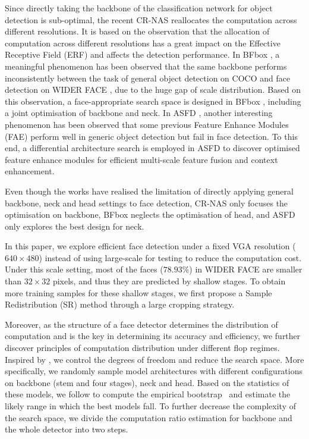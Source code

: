 \documentclass[10pt,twocolumn,letterpaper]{article}
\begin{document}
Since directly taking the backbone of the classification network for object detection is sub-optimal, the recent CR-NAS \cite{liang2019computation} reallocates the computation across different resolutions. It is based on the observation that the allocation of computation across different resolutions has a great impact on the Effective Receptive Field (ERF) and affects the detection performance. In BFbox \cite{liu2020bfbox}, a meaningful phenomenon has been observed that the same backbone performs inconsistently between the task of general object detection on COCO \cite{lin2014microsoft} and face detection on WIDER FACE \cite{yang2016wider}, due to the huge gap of scale distribution. Based on this observation, a face-appropriate search space is designed in BFbox \cite{liu2020bfbox}, including a joint optimisation of backbone and neck. In ASFD \cite{zhang2020asfd}, another interesting phenomenon has been observed that some previous Feature Enhance Modules (FAE) perform well in generic object detection but fail in face detection. To this end, a differential architecture search is employed in ASFD \cite{zhang2020asfd} to discover optimised feature enhance modules for efficient multi-scale feature fusion and context enhancement.

Even though the works \cite{liu2020bfbox,zhang2020asfd} have realised the limitation of directly applying general backbone, neck and head settings to face detection, CR-NAS \cite{liang2019computation} only focuses the optimisation on backbone, BFbox \cite{liu2020bfbox} neglects the optimisation of head, and ASFD \cite{zhang2020asfd} only explores the best design for neck.

In this paper, we explore efficient face detection under a fixed VGA resolution (\ie $640\times480$) instead of using large-scale for testing \cite{zhu2020tinaface} to reduce the computation cost. Under this scale setting, most of the faces ($78.93\%$) in WIDER FACE are smaller than $32\times32$ pixels, and thus they are predicted by shallow stages. To obtain more training samples for these shallow stages, we first propose a Sample Redistribution (SR) method through a large cropping strategy. 

Moreover, as the structure of a face detector determines the distribution of computation and is the key in determining its accuracy and efficiency, we further discover principles of computation distribution under different flop regimes. Inspired by \cite{radosavovic2020designing}, we control the degrees of freedom and reduce the search space. More specifically, we randomly sample model architectures with different configurations on backbone (stem and four stages), neck and head. Based on the statistics of these models, we follow \cite{radosavovic2020designing} to compute the empirical bootstrap~\cite{Efron1994} and estimate the likely range in which the best models fall. To further decrease the complexity of the search space, we divide the computation ratio estimation for backbone and the whole detector into two steps.
\end{document}
